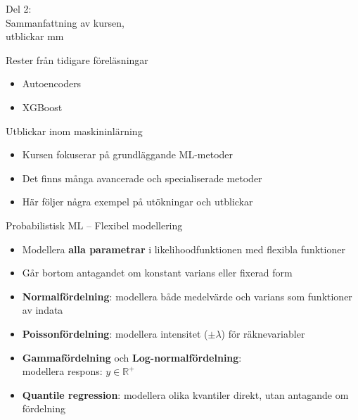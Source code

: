 \documentclass[10pt,english]{beamer}
\begin{document}
\begin{frame}[standout]
    \LARGE Del 2: \\ Sammanfattning av kursen, \\ utblickar mm
\end{frame}


\begin{frame}{Rester från tidigare föreläsningar}
\begin{itemize}
    \item Autoencoders
    \item XGBoost
\end{itemize}
\end{frame}

\begin{frame}{Utblickar inom maskininlärning}
  \begin{itemize}
    \item Kursen fokuserar på grundläggande ML-metoder
    \item Det finns många avancerade och specialiserade metoder
    \item Här följer några exempel på utökningar och utblickar
  \end{itemize}
\end{frame}

\begin{frame}{Probabilistisk ML – Flexibel modellering}
  \begin{itemize}
    \item Modellera \textbf{alla parametrar} i likelihoodfunktionen med flexibla funktioner
    \item Går bortom antagandet om konstant varians eller fixerad form
    \item \textbf{Normalfördelning}: modellera både medelvärde och varians som funktioner av indata
    \item \textbf{Poissonfördelning}: modellera intensitet ($±\lambda$) för räknevariabler
    \item \textbf{Gammafördelning} och \textbf{Log-normalfördelning}: \\ modellera respons: $y\in \mathbb{R}^+$
    \item \textbf{Quantile regression}: modellera olika kvantiler direkt, utan antagande om fördelning
  \end{itemize}
\end{frame}
\end{document}
